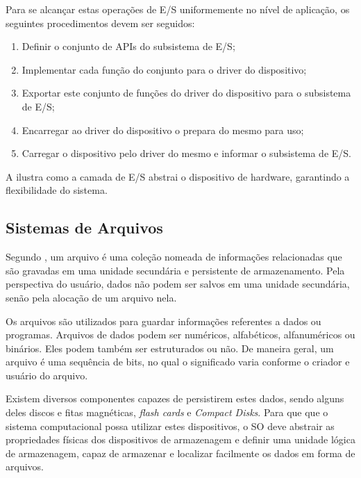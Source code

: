 Para se alcançar estas operações de E/S uniformemente no nível de aplicação, os seguintes procedimentos devem ser seguidos:

\begin{enumerate}
	\item Definir o conjunto de APIs do subsistema de E/S;
	\item Implementar cada função do conjunto para o driver do dispositivo;
	\item Exportar este conjunto de funções do driver do dispositivo para o subsistema de E/S;
	\item Encarregar ao driver do dispositivo o prepara do mesmo para uso;
	\item Carregar o dispositivo pelo driver do mesmo e informar o subsistema de E/S.
\end{enumerate}

A  ilustra como a camada de E/S abstrai o dispositivo de hardware, garantindo a flexibilidade do sistema.


\subsection{Sistemas de Arquivos}

Segundo , um arquivo é uma coleção nomeada de informações relacionadas que são gravadas em uma unidade secundária e persistente de armazenamento. Pela perspectiva do usuário, dados não podem ser salvos em uma unidade secundária, senão pela alocação de um arquivo nela.

Os arquivos são utilizados para guardar informações referentes a dados ou programas. Arquivos de dados podem ser numéricos, alfabéticos, alfanuméricos ou binários. Eles podem também ser estruturados ou não. De maneira geral, um arquivo é uma sequência de bits, no qual o significado varia conforme o criador e usuário do arquivo.

Existem diversos componentes capazes de persistirem estes dados, sendo alguns deles discos e fitas magnéticas, \emph{flash cards} e \emph{Compact Disks}. Para que que o sistema computacional possa utilizar estes dispositivos, o SO deve abstrair as propriedades físicas dos dispositivos de armazenagem e definir uma unidade lógica de armazenagem, capaz de armazenar e localizar facilmente os dados em forma de arquivos.

